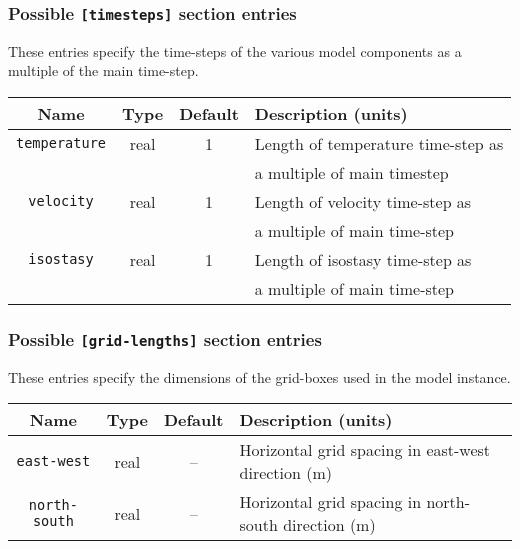 \subsubsection{Possible \texttt{[timesteps]} section entries}
%
These entries specify the time-steps of the various model components as a
multiple of the main time-step.
\begin{center}
\begin{tabular}{|c|c|c|l|}
\hline
Name & Type & Default & Description (units)\\
\hline
\hline
\texttt{temperature} & real & 1 & Length of temperature time-step as \\
 & & & a multiple of main timestep \\
\hline
\texttt{velocity}    & real & 1 & Length of velocity time-step as \\
 & & & a multiple of main time-step\\
\hline
\texttt{isostasy}    & real & 1 & Length of isostasy time-step as \\
 & & & a multiple of main time-step\\
\hline
\end{tabular}
\end{center}
%
\subsubsection{Possible \texttt{[grid-lengths]} section entries}
%
These entries specify the dimensions of the grid-boxes used in the model instance.
\begin{center}
\begin{tabular}{|c|c|c|l|}
\hline
Name & Type & Default & Description (units)\\
\hline
\hline
\texttt{east-west} & real & -- & Horizontal grid spacing in east-west direction (m)
\\
\hline
\texttt{north-south} & real & -- & Horizontal grid spacing in north-south direction (m) \\
\hline
\end{tabular}
\end{center}
%
